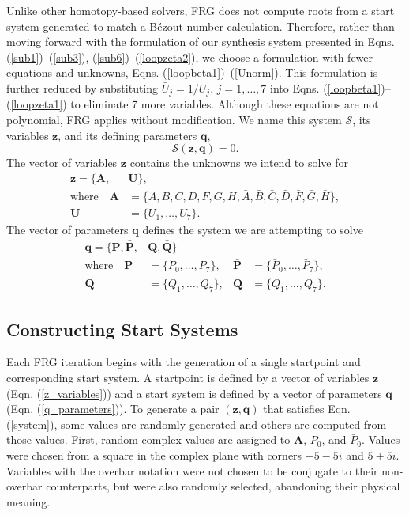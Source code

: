 \documentclass[journal]{IEEEtran}
\def\*#1{\bar{#1}} %
\begin{document}
Unlike other homotopy-based solvers, FRG does not compute roots from a start system generated to match a B\'{e}zout number calculation.
Therefore, rather than moving forward with the formulation of our synthesis system presented in Eqns. (\ref{sub1})--(\ref{sub3}), (\ref{sub6})--(\ref{loopzeta2}), we choose a formulation with fewer equations and unknowns, Eqns. (\ref{loopbeta1})--(\ref{Unorm}).
This formulation is further reduced by substituting $\*U_j = 1/U_j$, $j=1,\ldots,7$ into Eqns. (\ref{loopbeta1})--(\ref{loopzeta1}) to eliminate 7 more variables. 
Although these equations are not polynomial, FRG applies without modification.
We name this system $\mathcal{S}$, its variables $\mathbf{z}$, and its defining parameters $\mathbf{q}$,
\begin{equation}
\mathcal{S}(\mathbf{z},\mathbf{q}) = 0.
\label{system}
\end{equation}
The vector of variables $\mathbf{z}$ contains the unknowns we intend to solve for
\begin{align}
\mathbf{z} = \{ \mathbf{A}, &\mathbf{U} \}, \label{z_variables}\\
\text{where} \quad
\mathbf{A} &= \{ A, B, C, D, F, G, H, \*A, \*B, \*C, \*D, \*F, \*G, \*H \}, \nonumber\\
\mathbf{U} &= \{ U_1, \ldots, U_7 \}. \nonumber
\end{align}
The vector of parameters $\mathbf{q}$ defines the system we are attempting to solve
\begin{align}
\mathbf{q} = \{\mathbf{P}, \*{\mathbf{P}}, &\mathbf{Q}, \*{\mathbf{Q}} \} & & \label{q_parameters}\\
\text{where} \quad
\mathbf{P} &= \{ P_0, \ldots, P_7 \}, & \*{\mathbf{P}} &= \{ \*P_0, \ldots, \*P_7 \}, \nonumber\\
\mathbf{Q} &= \{ Q_1, \ldots, Q_7 \}, & \*{\mathbf{Q}} &= \{ \*Q_1, \ldots, \*Q_7 \}. \nonumber
\end{align}



\subsection{Constructing Start Systems}
\label{sec:start_sys}


Each FRG iteration begins with the generation of a single startpoint and corresponding start system.  A startpoint is defined by a vector of variables $\mathbf{z}$ (Eqn. (\ref{z_variables})) and a start system is defined by a vector of parameters $\mathbf{q}$ (Eqn. (\ref{q_parameters})).
To generate a pair $(\mathbf{z}, \mathbf{q})$ that satisfies Eqn. (\ref{system}), some values are randomly generated and others are computed from those values.
First, random complex values are assigned to $\mathbf{A}$, $P_0$, and $\*P_0$.  
Values were chosen from a square in the complex plane with corners $-5-5i$ and $5+5i$.
Variables with the overbar notation were not chosen to be conjugate to their non-overbar counterparts, but were also randomly selected, abandoning their physical meaning.
\end{document}
